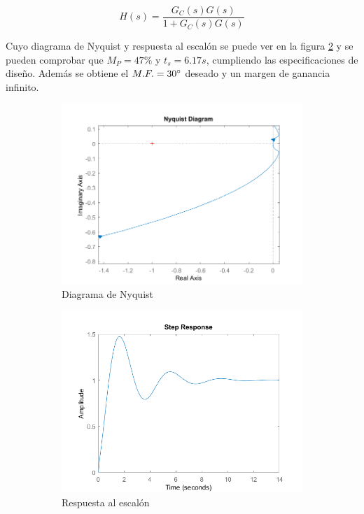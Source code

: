 \documentclass[a4paper]{article}
\begin{document}
\begin{equation}
H(s)=\frac{G_C(s) G(s)}{1 + G_C(s) G(s)}
\end{equation}

Cuyo diagrama de Nyquist y respuesta al escalón se puede ver en la figura \ref{fig:sim} y se pueden comprobar que $M_P=47\%$ y $t_s=6.17 s$, cumpliendo las especificaciones de diseño. Además se obtiene el $M.F. = 30\degree$ deseado y un margen de ganancia infinito.

\begin{center}
	\begin{figure}[htp]
		\begin{subfigure}{1\textwidth}
			\centering
			\includegraphics[width=12cm]{nyquist2}
			\caption{Diagrama de Nyquist}
		\end{subfigure}
		
		\begin{subfigure}{1\textwidth}
			\centering
			\includegraphics[width=12cm]{respuesta}
			\caption{Respuesta al escalón}
			\label{escalonteorico}
		\end{subfigure}
		\caption{}
		\label{fig:sim}
	\end{figure}
\end{center}
\end{document}
